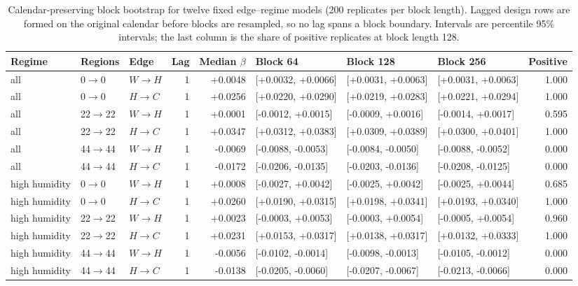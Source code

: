 \documentclass[11pt]{article}
\begin{document}
\begin{table}[htbp]
\centering
\caption{Calendar-preserving block bootstrap for twelve fixed edge--regime models (200 replicates per block length). Lagged design rows are formed on the original calendar before blocks are resampled, so no lag spans a block boundary. Intervals are percentile 95\% intervals; the last column is the share of positive replicates at block length 128.}
\label{tab:s8}
\scriptsize
\setlength{\tabcolsep}{3pt}\begin{tabular}{@{}lllrrlllr@{}}
\toprule
Regime & Regions & Edge & Lag & Median $\beta$ & Block 64 & Block 128 & Block 256 & Positive \\
\midrule
all & 0$\rightarrow$0 & $W\rightarrow H$ & 1 & +0.0048 & [+0.0032, +0.0066] & [+0.0031, +0.0063] & [+0.0031, +0.0063] & 1.000 \\
all & 0$\rightarrow$0 & $H\rightarrow C$ & 1 & +0.0256 & [+0.0220, +0.0290] & [+0.0219, +0.0283] & [+0.0221, +0.0294] & 1.000 \\
all & 22$\rightarrow$22 & $W\rightarrow H$ & 1 & +0.0001 & [-0.0012, +0.0015] & [-0.0009, +0.0016] & [-0.0014, +0.0017] & 0.595 \\
all & 22$\rightarrow$22 & $H\rightarrow C$ & 1 & +0.0347 & [+0.0312, +0.0383] & [+0.0309, +0.0389] & [+0.0300, +0.0401] & 1.000 \\
all & 44$\rightarrow$44 & $W\rightarrow H$ & 1 & -0.0069 & [-0.0088, -0.0053] & [-0.0084, -0.0050] & [-0.0088, -0.0052] & 0.000 \\
all & 44$\rightarrow$44 & $H\rightarrow C$ & 1 & -0.0172 & [-0.0206, -0.0135] & [-0.0203, -0.0136] & [-0.0208, -0.0125] & 0.000 \\
high humidity & 0$\rightarrow$0 & $W\rightarrow H$ & 1 & +0.0008 & [-0.0027, +0.0042] & [-0.0025, +0.0042] & [-0.0025, +0.0044] & 0.685 \\
high humidity & 0$\rightarrow$0 & $H\rightarrow C$ & 1 & +0.0260 & [+0.0190, +0.0315] & [+0.0198, +0.0341] & [+0.0193, +0.0340] & 1.000 \\
high humidity & 22$\rightarrow$22 & $W\rightarrow H$ & 1 & +0.0023 & [-0.0003, +0.0053] & [-0.0003, +0.0054] & [-0.0005, +0.0054] & 0.960 \\
high humidity & 22$\rightarrow$22 & $H\rightarrow C$ & 1 & +0.0231 & [+0.0153, +0.0317] & [+0.0138, +0.0317] & [+0.0132, +0.0333] & 1.000 \\
high humidity & 44$\rightarrow$44 & $W\rightarrow H$ & 1 & -0.0056 & [-0.0102, -0.0014] & [-0.0098, -0.0013] & [-0.0105, -0.0012] & 0.000 \\
high humidity & 44$\rightarrow$44 & $H\rightarrow C$ & 1 & -0.0138 & [-0.0205, -0.0060] & [-0.0207, -0.0067] & [-0.0213, -0.0066] & 0.000 \\
\bottomrule
\end{tabular}
\end{table}
\end{document}
